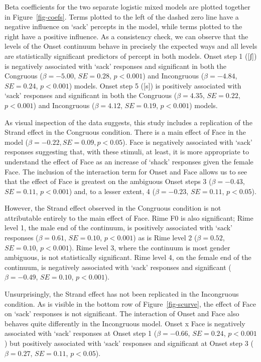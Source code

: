 \documentclass[
  letterpaper,
  DIV=11,
  numbers=noendperiod]{scrartcl}
\begin{document}
Beta coefficients for the two separate logistic mixed models are plotted
together in Figure~\ref{fig-coefs}. Terms plotted to the left of the
dashed zero line have a negative influence on `sack' percepts in the
model, while terms plotted to the right have a positive influence. As a
consistency check, we can observe that the levels of the Onset continuum
behave in precisely the expected ways and all levels are statistically
significant predictors of percept in both models. Onset step 1 ({[}ʃ{]})
is negatively associated with `sack' responses and significant in both
the Congruous (\(β=-5.00\), \(SE=0.28\), \(p < 0.001\)) and Incongruous
(\(β=-4.84\), \(SE=0.24\), \(p < 0.001\)) models. Onset step 5 ({[}s{]})
is positively associated with `sack' responses and significant in both
the Congruous (\(β=4.35\), \(SE=0.22\), \(p < 0.001\)) and Incongruous
(\(β=4.12\), \(SE=0.19\), \(p < 0.001\)) models.

As visual inspection of the data suggests, this study includes a
replication of the Strand effect in the Congruous condition. There is a
main effect of Face in the model (\(β=-0.22, SE=0.09, p<0.05\)). Face is
negatively associated with `sack' responses suggesting that, with these
stimuli, at least, it is more appropriate to understand the effect of
Face as an increase of `shack' responses given the female Face. The
inclusion of the interaction term for Onset and Face allows us to see
that the effect of Face is greatest on the ambiguous Onset steps 3
(\(β=-0.43\), \(SE=0.11\), \(p < 0.001\)) and, to a lesser extent, 4
(\(β=-0.23\), \(SE=0.11\), \(p < 0.05\)).

However, the Strand effect observed in the Congruous condition is not
attributable entirely to the main effect of Face. Rime F0 is also
significant; Rime level 1, the male end of the continuum, is positively
associated with `sack' responses (\(β=0.61\), \(SE=0.10\),
\(p < 0.001\)) as is Rime level 2 (\(β=0.52\), \(SE=0.10\),
\(p < 0.001\)). Rime level 3, where the continuum is most gender
ambiguous, is not statistically significant. Rime level 4, on the female
end of the continuum, is negatively associated with `sack' responses and
significant (\(β=-0.49\), \(SE=0.10\), \(p < 0.001\)).

Unsurprisingly, the Strand effect has not been replicated in the
Incongruous condition. As is visible in the bottom row of
Figure~\ref{fig-scurve}, the effect of Face on `sack' responses is not
significant. The interaction of Onset and Face also behaves quite
differently in the Incongruous model. Onset x Face is negatively
associated with `sack' responses at Onset step 1 (\(β=-0.66\),
\(SE=0.24\), \(p < 0.001\)) but positively associated with `sack'
responses and significant at Onset step 3 (\(β=0.27\), \(SE=0.11\),
\(p < 0.05\)).
\end{document}
